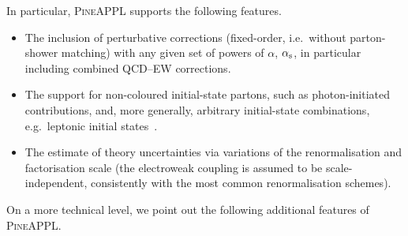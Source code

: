 In particular, \textsc{PineAPPL} supports the following features.
\begin{itemize}
\item The inclusion of perturbative corrections (fixed-order, i.e.\ without parton-shower matching) with any given set of powers of $\alpha$, $\alpha_\mathrm{s}$, in particular including combined QCD--EW corrections.
\item The support for non-coloured initial-state partons, such as photon-initiated contributions, and, more generally, arbitrary initial-state combinations, e.g.\ leptonic initial states~\cite{Bertone:2015lqa,Buonocore:2020nai}.
\item The estimate of theory uncertainties via variations of the renormalisation and factorisation scale (the electroweak coupling is assumed to be scale-independent, consistently with the most common renormalisation schemes).
\end{itemize}
On a more technical level, we point out the following additional features of \textsc{PineAPPL}.

